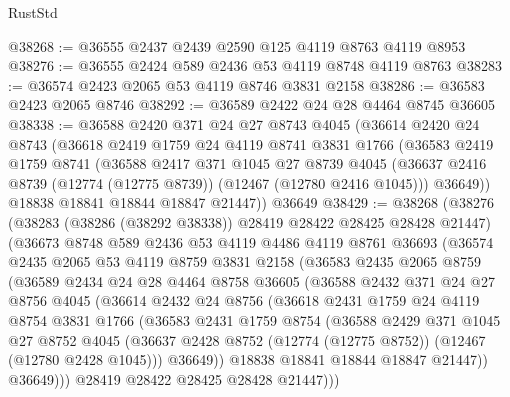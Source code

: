 \begin{lexlean}{RustStd}
\begin{coremodule}
@38268 := @36555 @2437 @2439 @2590 @125 @4119 @8763 @4119 @8953
@38276 := @36555 @2424 @589 @2436 @53 @4119 @8748 @4119 @8763
@38283 := @36574 @2423 @2065 @53 @4119 @8746 @3831 @2158
@38286 := @36583 @2423 @2065 @8746
@38292 := @36589 @2422 @24 @28 @4464 @8745 @36605
@38338 := @36588
    @2420
    @371
    @24
    @27
    @8743
    @4045
    (@36614
      @2420
      @24
      @8743
      (@36618
        @2419
        @1759
        @24
        @4119
        @8741
        @3831
        @1766
        (@36583
          @2419
          @1759
          @8741
          (@36588
            @2417
            @371
            @1045
            @27
            @8739
            @4045
            (@36637 @2416 @8739 (@12774 (@12775 @8739)) (@12467 (@12780 @2416 @1045)))
            @36649))
        @18838
        @18841
        @18844
        @18847
        @21447))
    @36649
@38429 := @38268
    (@38276
      (@38283 (@38286 (@38292 @38338)) @28419 @28422 @28425 @28428 @21447)
      (@36673
        @8748
        @589
        @2436
        @53
        @4119
        @4486
        @4119
        @8761
        @36693
        (@36574
          @2435
          @2065
          @53
          @4119
          @8759
          @3831
          @2158
          (@36583
            @2435
            @2065
            @8759
            (@36589
              @2434
              @24
              @28
              @4464
              @8758
              @36605
              (@36588
                @2432
                @371
                @24
                @27
                @8756
                @4045
                (@36614
                  @2432
                  @24
                  @8756
                  (@36618
                    @2431
                    @1759
                    @24
                    @4119
                    @8754
                    @3831
                    @1766
                    (@36583
                      @2431
                      @1759
                      @8754
                      (@36588
                        @2429
                        @371
                        @1045
                        @27
                        @8752
                        @4045
                        (@36637 @2428 @8752 (@12774 (@12775 @8752)) (@12467 (@12780 @2428 @1045)))
                        @36649))
                    @18838
                    @18841
                    @18844
                    @18847
                    @21447))
                @36649)))
          @28419
          @28422
          @28425
          @28428
          @21447)))

\end{coremodule}
\end{lexlean}
